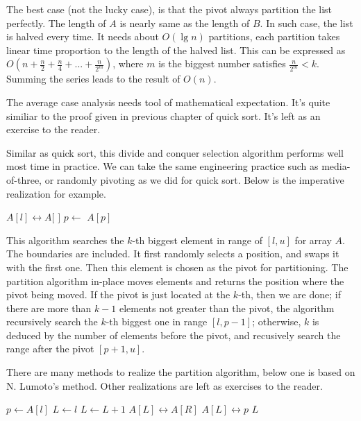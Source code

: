 \documentclass{article}
\begin{document}
The best case (not the lucky case), is that the pivot always partition the list perfectly.
The length of $A$ is nearly same as the length of $B$. In such case, the list is halved
every time. It needs about $O(\lg n)$ partitions, each partition takes linear time proportion
to the length of the halved list. This can be expressed as 
$O(n + \frac{n}{2} + \frac{n}{4} + ... + \frac{n}{2^m})$, where $m$ is the biggest number satisfies
$\frac{n}{2^m} < k$. Summing the series leads to the result of $O(n)$.

The average case analysis needs tool of mathematical expectation. It's quite similiar to the
proof given in previous chapter of quick sort. It's left as an exercise to the reader.

Similar as quick sort, this divide and conquer selection algorithm performs well most time
in practice. We can take the same engineering practice such as media-of-three, or randomly
pivoting as we did for quick sort. Below is the imperative realization for example.

\begin{algorithmic}[1]
  \State {} $A[l] \leftrightarrow A[$  $]$ 
  \State $p \gets$ 
    \State \Return $A[p]$
  \EndIf
    \State \Return {}
  \EndIf
  \State \Return {}
\EndFunction
\end{algorithmic}

This algorithm searches the $k$-th biggest element in range of $[l, u]$ for array $A$. The boundaries
are included. It first randomly selects a position, and swaps it with the first one. Then this element
is chosen as the pivot for partitioning. The partition algorithm in-place moves elements and 
returns the position where the pivot being moved. If the pivot is just located at the $k$-th, then
we are done; if there are more than $k-1$ elements not greater than the pivot, the algorithm 
recursively search the $k$-th biggest one in range $[l, p-1]$; otherwise, $k$ is deduced by the
number of elements before the pivot, and recusively search the range after the pivot $[p+1, u]$.

There are many methods to realize the partition algorithm, below one is based on N. Lumoto's method.
Other realizations are left as exercises to the reader.

\begin{algorithmic}[1]
  \State $p \gets A[l]$ 
  \State $L \gets l$ 
      \State $L \gets L + 1$
      \State {} $A[L] \leftrightarrow A[R]$
    \EndIf
  \EndFor
  \State {} $A[L] \leftrightarrow p$
  \State \Return $L$
\EndFunction
\end{algorithmic}
\end{document}
